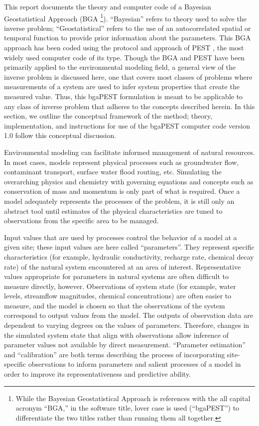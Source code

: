\documentclass[11pt,oneside,onecolumn]{usgsreport}
\begin{document}
\begin{multicols}{2}
\begin{bibunit}
This report documents the theory and computer code of a Bayesian Geostatistical
Approach (BGA%
\footnote[3]{While the Bayesian Geostatistical Approach is references with the
all capital acronym ``BGA,'' in the software title, lover case is
used (``bgaPEST'') to differentiate the two titles rather than running
them all together.%
}). ``Bayesian'' refers to theory used to solve the inverse problem;
``Geostatistical'' refers to the  use of an autocorrelated spatial
or temporal function to provide prior information about the parameters.
This BGA approach has been coded using the protocol and approach of
PEST \citep{PEST,PESTAdd}, the most widely used computer code of
its type. Though the BGA and PEST have been primarily applied to the
environmental modeling field, a general view of the inverse problem
is discussed here, one that covers most classes of problems where
measurements of a system are used to infer system properties that
create the measured value. Thus, this bgaPEST formulation is meant
to be applicable to any class of inverse problem that adheres to the
concepts described herein. In this section, we outline the conceptual
framework of the method; theory, implementation, and instructions
for use of the bgaPEST computer code version 1.0 follow this conceptual
discussion.

Environmental modeling can facilitate informed management of natural
resources. In most cases, models represent physical processes such
as groundwater flow, contaminant transport, surface water flood routing,
etc. Simulating the overarching physics and chemistry with governing
equations and concepts such as conservation of mass and momentum is
only part of what is required. Once a model adequately represents
the processes of the problem, it is still only an abstract tool until
estimates of the physical characteristics are tuned to observations
from the specific area to be managed. 

Input values that are used by processes control the behavior of a
model at a given site; these input values are here called ``parameters''.
They represent specific characteristics (for example, hydraulic conductivity,
recharge rate, chemical decay rate) of the natural system encountered
at an  area of interest. Representative values appropriate for parameters
in natural systems are often difficult to measure directly, however.
Observations of system state (for example, water levels, streamflow
magnitudes, chemical concentrations) are often easier to measure,
and the model is chosen so that the observations of the system correspond
to output values from the model. The outputs of observation data are
dependent to varying degrees on the values of parameters. Therefore,
 changes in the simulated system state that align with observations
allow inference of parameter values not available by direct measurement.
 ``Parameter estimation'' and ``calibration'' are both terms describing
the process of incorporating site-specific observations to inform
parameters and salient processes of a model in order to improve its
representativeness and predictive ability.


\end{bibunit}
\end{multicols}
\end{document}
